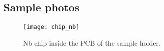 \documentclass[12pt]{article}
\numberwithin{equation}{section}
\begin{document}
\begin{comment}
\section{Summary}

Two resonator samples were studied, fabricated from Al and Nb films. Using the  \textit{circlefit} method the quality factors and frequencies were extracted at various probe powers ranging from single photon occupation regime to high powers.

The Nb sample has shown errors less than 1\% in frequency and more or less consistent quality factors; however, for the devices IV and VI $Q_e$ are significantly lower than for the rest. The internal quality factors have demonstrated an expected behaviour when the probe power was changed, ranging from $1.5\cdot10^4$ at single-photon level to maximum of $1.2 \cdot 10^5$ at high powers. The single-photon Q-factors are all similar heralding the uniform distribution of defects on the chip.

The Al sample has shown less than 2\% errors in frequency; however, if the correction for the wrong $\varepsilon_{Si}$ used in the calculation is applied, the errors would rise up to 3\%. The external quality factors are in deviation from the rest of the resonators for the devices III and VI. The internal quality factors are more uniform in values compared to the Nb sample, significantly lower at high powers and significantly higher at single-photon level. All values are in the range between $3\cdot10^4$ and $6 \cdot 10^4$.

In conclusion, it should be stated that Al technology is more suitable for the cQED experiments due to the apparently lower concentration of defects inside the surface oxide. However, the technological issues with fabricating aluminium chips at MIPT still are to be overcome. High hopes are anchored on NbN films which are known to have a large superconducting gap, and thus a suppressed quasiparticle concentration and no natural oxide layer in contrast to Nb or Al.
\end{comment}


\begin{appendices}

\section{Sample photos}

\begin{figure}[h]
\centering
\texttt{[image: chip\_nb]}
\caption{Nb chip inside the PCB of the sample holder.}
\end{figure}

\end{appendices}

\newpage



\end{document}
